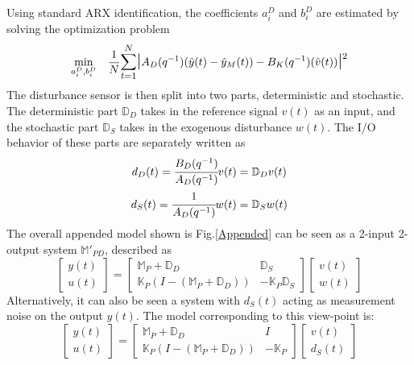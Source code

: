 \documentclass[letterpaper, 10 pt, conference]{ieeeconf}  %
\begin{document}
	Using standard ARX identification, the coefficients $a_i^D$ and $b_i^D$ are estimated by solving the optimization problem
	\begin{equation}
	\begin{aligned}
	& \underset{a_i^D,b_i^D}{\text{min}}
	& & \frac{1}{N}\mathlarger{\sum\limits_{t=1}^N}\mathlarger{\mathlarger{|}}A_D(q^{-1})(\hat{y}(t)-\hat{y}_M(t))-B_K(q^{-1})(\hat{v}(t))\mathlarger{\mathlarger{|}}^2 \\
	\end{aligned}
	\label{DSensor}
	\end{equation}
	The disturbance sensor is then split into two parts, deterministic and stochastic. The deterministic part $\mathbb{D}_D$ takes in the reference signal $v(t)$ as an input, and the stochastic part $\mathbb{D}_S$ takes in the exogenous disturbance $w(t)$. The I/O behavior of these parts are separately written as 
	\begin{equation*}
	\begin{matrix}
	d_D(t) = \cfrac{B_D(q^{-1})}{A_D(q^{-1})}v(t) = \mathbb{D}_D v(t) \vspace{4pt} \\  
	d_S(t) = \cfrac{1}{A_D(q^{-1})}w(t) = \mathbb{D}_S w(t)
	\end{matrix}
	\end{equation*}
	The overall appended model shown is Fig.\ref{Appended} can be seen as a 2-input 2-output system $\mathbb{M}'_{PD}$, described as
	\begin{equation}
	\begin{bmatrix}
	y(t) \\ u(t)
	\end{bmatrix} = 
	\begin{bmatrix} 
	\mathbb{M}_P+\mathbb{D}_D & \mathbb{D}_S \\
	\mathbb{K}_P(I-(\mathbb{M}_P+\mathbb{D}_D)) &  -\mathbb{K}_P\mathbb{D}_S
	\end{bmatrix}
	\begin{bmatrix}
	v(t) \\ w(t)
	\end{bmatrix}
	\label{TF_w}
	\end{equation}
	Alternatively, it can also be seen a system with $d_S(t)$ acting as measurement noise on the output $y(t)$. The model corresponding to this view-point is:
	\begin{equation}
	\begin{bmatrix}
	y(t) \\ u(t)
	\end{bmatrix} = 
	\begin{bmatrix} 
	\mathbb{M}_P+\mathbb{D}_D & I \\
	\mathbb{K}_P(I-(\mathbb{M}_P+\mathbb{D}_D)) &  -\mathbb{K}_P
	\end{bmatrix}
	\begin{bmatrix}
	v(t) \\ d_S(t)
	\end{bmatrix}
	\label{TF_d}
	\end{equation} 
\end{document}
